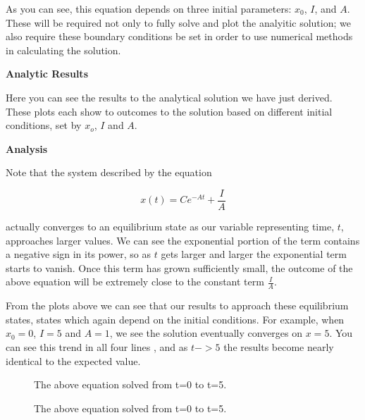 \documentclass[a4paper,12pt]{article}
\begin{document}
As you can see, this equation depends on three initial parameters: $x_0$, $I$, and $A$. These will be required not only to fully solve and plot the analyitic solution; we also require these boundary conditions be set in order to use numerical methods in calculating the solution.

\bigskip
{\bf Analytic Results}
\bigskip 

Here you can see the results to the analytical solution we have just derived. These plots each show to outcomes to the solution based on different initial conditions, set by $x_o$, $I$ and $A$.

\bigskip
{\bf Analysis}
\bigskip 

Note that the system described by the equation 

\begin{equation}
x(t) = Ce^{-At} + \frac{I}{A}
\end{equation}

actually converges to an equilibrium state as our variable representing time, $t$, approaches larger values. We can see the exponential portion of the term contains a negative sign in its power, so as $t$ gets larger and larger the exponential term starts to vanish. Once this term has grown sufficiently small, the outcome of the above equation will be extremely close to the constant term $\frac{I}{A}$. 

From the plots above we can see that our results to approach these equilibrium states, states which again depend on the initial conditions. For example, when $x_0=0$, $I=5$ and $A=1$, we see the solution eventually converges on $x=5$. You can see this trend in all four lines , and as $t->5$ the results become nearly identical to the expected value. 

\begin{figure}[h!]
\begin{center}
\end{center}
\caption{\label{pict1} The above equation solved from t=0 to t=5. }
\end{figure}

 

\begin{figure}[h!]
\begin{center}
\end{center}
\caption{\label{pict1} The above equation solved from t=0 to t=5. }
\end{figure}
\end{document}
